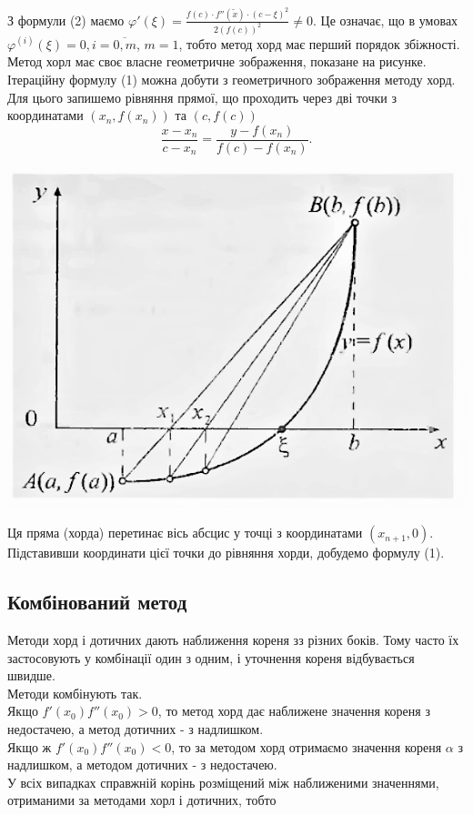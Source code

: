 \documentclass[14pt,a4paper,titlepage]{extarticle}
\begin{document}
З формули (2) маємо $\varphi'(\xi) = \frac{f(c)\cdot f''(\tilde{x})\cdot (c - \xi)^2}{2(f(c))^2} \neq 0$. Це означає, що в умовах $\varphi^{(i)}(\xi) = 0, i = \overline{0,m}$, $m = 1$, тобто метод хорд має перший порядок збіжності.
Метод хорл має своє власне геометричне зображення, показане на рисунке.\\
Ітераційну формулу (1) можна добути з геометричного зображення методу хорд. Для цього запишемо рівняння прямої, що проходить через дві точки з координатами $(x_n, f(x_n))$ та $(c, f(c))$
$$
\frac{x - x_n}{c - x_n} = \frac{y - f(x_n)}{f(c) - f(x_n)}.
$$
{\centering\includegraphics{11}\par}
Ця пряма (хорда) перетинає вісь абсцис у точці з координатами $(x_{n+1}, 0)$. Підставивши координати цієї точки до рівняння хорди, добудемо формулу (1).
{\centering \subsection{Комбінований метод}}
Методи хорд і дотичних дають наближення кореня зз різних боків. Тому часто їх застосовують у комбінації один з одним, і уточнення кореня відбувається швидше.\\
Методи комбінують так.\\
Якщо $f'(x_0)f''(x_0) > 0$, то метод хорд дає наближене значення кореня з недостачею, а метод дотичних - з надлишком.\\
Якщо ж $f'(x_0)f''(x_0) < 0$, то за методом хорд отримаємо значення кореня $\alpha$ з надлишком, а методом дотичних - з недостачею.\\
У всіх випадках справжній корінь розміщений між наближеними значеннями, отриманими за методами хорл і дотичних, тобто
\end{document}
